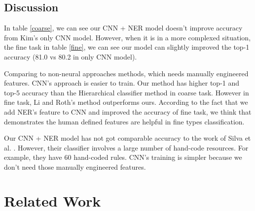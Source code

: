 \documentclass[10pt,twocolumn,letterpaper]{article}
\begin{document}
\subsection{Discussion}
In table \ref{coarse}, we can see our CNN + NER model doesn't improve accuracy from Kim's only CNN model. However, when it is in a more complexed situation, the fine task in table \ref{fine}, we can see our model can slightly improved the top-1 accuracy (81.0 vs 80.2 in only CNN model). 

Comparing to non-neural approaches methods, which needs manually engineered features. CNN's approach is easier to train. Our method has higher top-1 and top-5 accuracy than the Hierarchical classifier method in coarse task. However in fine task, Li and Roth's method outperforms ours. According to the fact that we add NER's feature to CNN and improved the accuracy of fine task, we think that demonstrates the human defined features are helpful in fine types classification. 

Our CNN + NER model has not got comparable accuracy to the work of Silva et al. \cite{silva2011symbolic}. However, their classifier involves a large number of hand-code resources. For example, they have 60 hand-coded rules. CNN's training is simpler because we don't need those manually engineered features. 

\section{Related Work}
\end{document}

